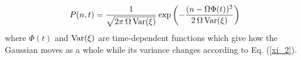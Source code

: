 \begin{equation}
	P(n,t) = \frac{1}{\sqrt{2\pi\,\Omega\,\textup{Var}(\xi)}}\exp\left(-\frac{(n-\Omega\Phi(t))^2}{2\,\Omega\,\textup{Var}(\xi)}\right)
\end{equation} 
where $\Phi(t)$ and $\textup{Var}(\xi)$ are time-dependent functions which give how the Gaussian moves as a whole while its variance changes according to Eq. (\ref{xi_2}).